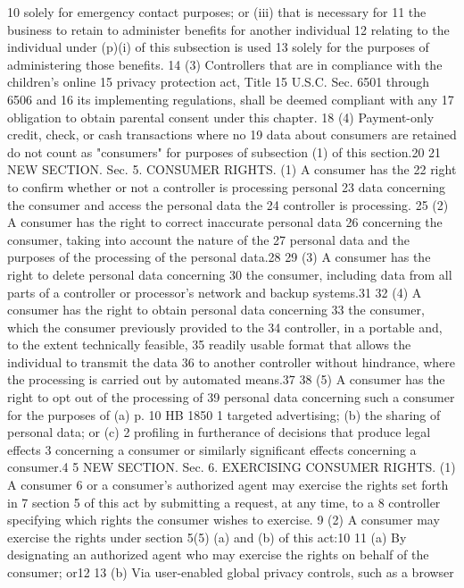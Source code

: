 10 solely for emergency contact purposes; or (iii) that is necessary for
11 the business to retain to administer benefits for another individual
12 relating to the individual under (p)(i) of this subsection is used
13 solely for the purposes of administering those benefits.
14 (3) Controllers that are in compliance with the children's online
15 privacy protection act, Title 15 U.S.C. Sec. 6501 through 6506 and
16 its implementing regulations, shall be deemed compliant with any
17 obligation to obtain parental consent under this chapter.
18 (4) Payment-only credit, check, or cash transactions where no
19 data about consumers are retained do not count as "consumers" for
purposes of subsection (1) of this section.20
21 NEW SECTION. Sec. 5. CONSUMER RIGHTS. (1) A consumer has the
22 right to confirm whether or not a controller is processing personal
23 data concerning the consumer and access the personal data the
24 controller is processing.
25 (2) A consumer has the right to correct inaccurate personal data
26 concerning the consumer, taking into account the nature of the
27 personal data and the purposes of the processing of the personal
data.28
29 (3) A consumer has the right to delete personal data concerning
30 the consumer, including data from all parts of a controller or
processor's network and backup systems.31
32 (4) A consumer has the right to obtain personal data concerning
33 the consumer, which the consumer previously provided to the
34 controller, in a portable and, to the extent technically feasible,
35 readily usable format that allows the individual to transmit the data
36 to another controller without hindrance, where the processing is
carried out by automated means.37
38 (5) A consumer has the right to opt out of the processing of
39 personal data concerning such a consumer for the purposes of (a)
p. 10 HB 1850
1 targeted advertising; (b) the sharing of personal data; or (c)
2 profiling in furtherance of decisions that produce legal effects
3 concerning a consumer or similarly significant effects concerning a
consumer.4
5 NEW SECTION. Sec. 6. EXERCISING CONSUMER RIGHTS. (1) A consumer
6 or a consumer's authorized agent may exercise the rights set forth in
7 section 5 of this act by submitting a request, at any time, to a
8 controller specifying which rights the consumer wishes to exercise.
9 (2) A consumer may exercise the rights under section 5(5) (a) and
(b) of this act:10
11 (a) By designating an authorized agent who may exercise the
rights on behalf of the consumer; or12
13 (b) Via user-enabled global privacy controls, such as a browser
